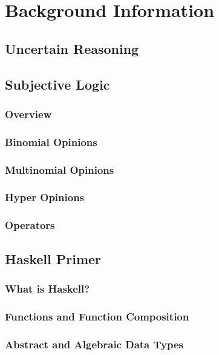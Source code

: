 \documentclass[thesis.tex]{subfiles}
\begin{document}
\chapter{Background Information}

\section{Uncertain Reasoning}

\section{Subjective Logic}

\subsection{Overview}

\subsection{Binomial Opinions}

\subsection{Multinomial Opinions}

\subsection{Hyper Opinions}

\subsection{Operators}

\section{Haskell Primer}

\subsection{What is Haskell?}

\subsection{Functions and Function Composition}

\subsection{Abstract and Algebraic Data Types}
\end{document}
